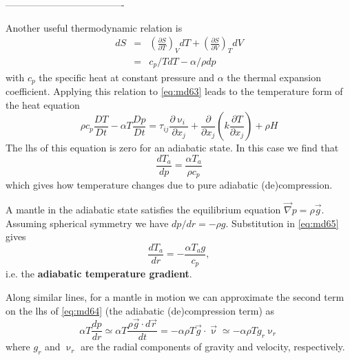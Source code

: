 -------------------------------------


Another useful thermodynamic relation is 
\begin{eqnarray}
dS 
&=& \left(\frac{\partial S}{\partial T} \right)_V dT  + \left(\frac{\partial S}{\partial V} \right)_T dV \\ 
&=& c_p/T dT -\alpha/\rho dp 
\end{eqnarray}
with $c_p$ the specific heat  at
constant pressure and $\alpha$ the thermal expansion coefficient. 
Applying this relation to \eqref{eq:md63}
leads to the temperature form of the heat equation
\begin{equation}
\rho c_p \frac{DT}{Dt} - \alpha T \frac{Dp}{Dt} = 
\tau_{ij} \frac{\partial \upnu_i}{\partial x_j} + 
\frac{\partial }{\partial x_j} (k \frac{\partial T}{\partial x_j}) + \rho H
\label{eq:md64}
\end{equation}
The lhs of this equation is zero for an adiabatic state. In this case we find that
\begin{equation}
\frac{dT_a}{dp} = \frac{\alpha T_a}{\rho c_p}
\label{eq:md65}
\end{equation}
which gives how temperature changes due to pure adiabatic (de)compression.

A mantle in the adiabatic state satisfies the equilibrium equation $\vec\nabla p = \rho \vec{g}$.
Assuming spherical symmetry we have $dp/dr=-\rho g$. Substitution in \eqref{eq:md65} gives
\begin{equation}
\frac{dT_a}{dr} = -\frac{\alpha T_a g}{c_p},
\label{eq:md66}
\end{equation}
i.e. the {\bf adiabatic temperature gradient}.

Along similar lines, for a mantle in motion we can approximate the second term on the
lhs of \eqref{eq:md64} (the adiabatic (de)compression term) as
\begin{equation}
\alpha T \frac{dp}{dr} \simeq \alpha T \frac{\rho \vec{g}\cdot d\vec{r}}{dt} 
= -\alpha \rho T \vec{g} \cdot \vec{\upnu}
\simeq -\alpha \rho T g_r \upnu_r 
\label{eq:md67}
\end{equation}
where $g_r$ and $\upnu_r$ are the radial
components of gravity and velocity, respectively.

\vspace{0.5cm}

